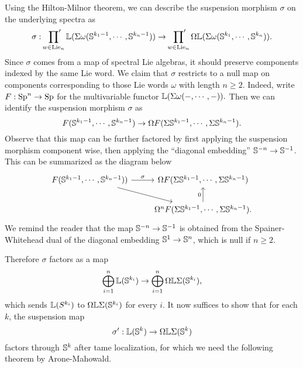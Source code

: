 Using the Hilton-Milnor theorem, we can describe the suspension morphism $\sigma$ on the underlying spectra as
$$
\sigma: 
\sideset{}{'}\prod_{w \in \operatorname{Lie}_n} {\mathbb{L}}(\Sigma \omega ({\mathbb{S}}^{k_1 -1}, \cdots, {\mathbb{S}}^{k_n -1}))
\to 
\sideset{}{'}\prod_{w \in \operatorname{Lie}_n} \Omega {\mathbb{L}}(\Sigma \omega ({\mathbb{S}}^{k_1 }, \cdots, {\mathbb{S}}^{k_n })).
$$
Since $\sigma$ comes from a map of spectral Lie algebras, it should preserve components indexed by the same Lie word.
We claim that $\sigma$ restricts to a null map on components corresponding to those Lie words $\omega$ with length $n\geq 2$. 
Indeed, write $F:\operatorname{Sp}^n \to \operatorname{Sp}$ for the multivariable functor
$
{\mathbb{L}} (\Sigma \omega(-, \cdots, -)).
$
Then we can identify the suspension morphism $\sigma$ as 
$$
F({\mathbb{S}}^{k_1 -1}, \cdots, {\mathbb{S}}^{k_n -1})
\to 
\Omega F(\Sigma {\mathbb{S}}^{k_1 -1}, \cdots, \Sigma{\mathbb{S}}^{k_n -1}).
$$
Observe that this map can be further factored by first applying the suspension morphism component wise, then applying the ``diagonal embedding'' ${\mathbb{S}}^{-n}\to {\mathbb{S}}^{-1}$. This can be summarized as the diagram below
\[
\begin{tikzcd}
     F(\BS^{k_1 -1}, \cdots, \BS^{k_n -1})) & \Omega F(\Sigma \BS^{k_1 -1}, \cdots, \Sigma\BS^{k_n -1})\\
     &     \Omega^{n} F(\Sigma \BS^{k_1 -1}, \cdots, \Sigma\BS^{k_n -1}).
     \arrow[from = 1-1, to = 1-2, "\sigma"]
     \arrow[from = 1-1, to = 2-2]
     \arrow[from = 2-2, to = 1-2, "0"]
\end{tikzcd}
\]
We remind the reader that the map ${\mathbb{S}}^{-n}\to {\mathbb{S}}^{-1}$ is obtained from the Spainer-Whitehead dual of the diagonal embedding ${\mathbb{S}}^1\to {\mathbb{S}}^{n}$, which is null if $n \geq 2$.

Therefore $\sigma$ factors as a map
$$
\bigoplus_{i=1}^{n} {\mathbb{L}}({\mathbb{S}}^{k_i}) \to 
\bigoplus_{i=1}^{n} \Omega{\mathbb{L}}\Sigma({\mathbb{S}}^{k_i}),
$$
which sends ${\mathbb{L}}(S^{k_i})$ to $\Omega{\mathbb{L}} \Sigma({\mathbb{S}}^{k_i})$ for every $i$.
It now suffices to show that for each $k$, the suspension map 
$$
\sigma':{\mathbb{L}}({\mathbb{S}}^{k}) \to 
\Omega{\mathbb{L}}\Sigma({\mathbb{S}}^{k})
$$
factors through ${\mathbb{S}}^{k}$ after tame localization, for which we need the following theorem by Arone-Mahowald.


